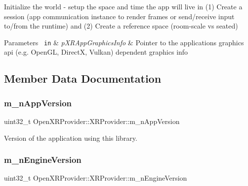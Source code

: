 Initialize the world -\/ setup the space and time the app will live in (1) Create a session (app communication instance to render frames or send/receive input to/from the runtime) and (2) Create a reference space (room-\/scale vs seated) 
\begin{DoxyParams}[1]{Parameters}
\mbox{\texttt{ in}}  & {\em p\+X\+R\+App\+Graphics\+Info} & Pointer to the application\textquotesingle{}s graphics api (e.\+g. Open\+GL, DirectX, Vulkan) dependent graphics info \\
\hline
\end{DoxyParams}


\subsection{Member Data Documentation}
\mbox{\label{class_open_x_r_provider_1_1_x_r_provider_aeede3bd8748b648cf9fd0d8527211047}} 
\subsubsection{\texorpdfstring{m\_nAppVersion}{m\_nAppVersion}}
{\footnotesize\ttfamily uint32\+\_\+t Open\+X\+R\+Provider\+::\+X\+R\+Provider\+::m\+\_\+n\+App\+Version\hspace{0.3cm}{\ttfamily [private]}}



Version of the application using this library. 

\mbox{\label{class_open_x_r_provider_1_1_x_r_provider_ae8ff1303046ba5c0f6e0d1e5e466198e}} 
\subsubsection{\texorpdfstring{m\_nEngineVersion}{m\_nEngineVersion}}
{\footnotesize\ttfamily uint32\+\_\+t Open\+X\+R\+Provider\+::\+X\+R\+Provider\+::m\+\_\+n\+Engine\+Version\hspace{0.3cm}{\ttfamily [private]}}



